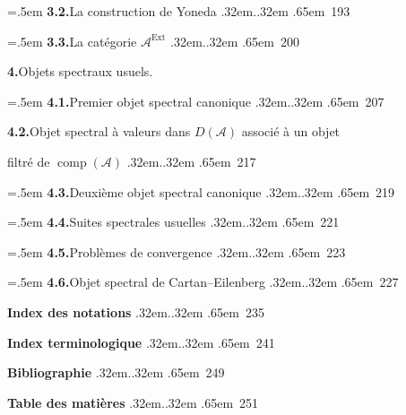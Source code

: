 \clearpage
{}%
\begingroup
\small
\setlength{\parindent}{0pt}%
\setlength{\parskip}{0pt}%
\setlength{\emergencystretch}{3em}%
\newcommand{\VerdierContentsRow}[3]{%
  \par\noindent
  \hangindent=#1\relax\hangafter=1
  \hspace*{#1}#2\nobreak
  \leaders\hbox{\kern.32em.\kern.32em}\hfill
  \nobreak\hbox{\kern.65em #3}\par}
\newcommand{\VerdierContentsWrappedRow}[3]{%
  \par\noindent\hspace*{.5em}#1\par\nobreak
  \noindent\hspace*{3.15em}#2\nobreak
  \leaders\hbox{\kern.32em.\kern.32em}\hfill
  \nobreak\hbox{\kern.65em #3}\par}
\newcommand{\VerdierContentsSection}[2]{%
  \par\addvspace{.55\baselineskip}\noindent
  \hfill\textbf{#1.}\enspace #2\hfill\mbox{}\par\smallskip}

%
\VerdierContentsRow{.5em}{\textbf{3.2.}\enspace La construction de Yoneda}{193}
%
\VerdierContentsRow{.5em}{\textbf{3.3.}\enspace La catégorie $\mathcal A^{\operatorname{Ext}}$}{200}

%
\VerdierContentsSection{4}{Objets spectraux usuels.}
%
\VerdierContentsRow{.5em}{\textbf{4.1.}\enspace Premier objet spectral canonique}{207}
%
\VerdierContentsWrappedRow{\textbf{4.2.}\enspace Objet spectral à valeurs dans $D(\mathcal A)$ associé à un objet}{filtré de $\operatorname{comp}(\mathcal A)$}{217}
%
\VerdierContentsRow{.5em}{\textbf{4.3.}\enspace Deuxième objet spectral canonique}{219}
%
\VerdierContentsRow{.5em}{\textbf{4.4.}\enspace Suites spectrales usuelles}{221}
%
\VerdierContentsRow{.5em}{\textbf{4.5.}\enspace Problèmes de convergence}{223}
%
\VerdierContentsRow{.5em}{\textbf{4.6.}\enspace Objet spectral de Cartan--Eilenberg}{227}

\vspace{1.2\baselineskip}
%
\VerdierContentsRow{0pt}{\textbf{Index des notations}}{235}
\vspace{.8\baselineskip}
%
\VerdierContentsRow{0pt}{\textbf{Index terminologique}}{241}
\vspace{.8\baselineskip}
%
\VerdierContentsRow{0pt}{\textbf{Bibliographie}}{249}
\vspace{.8\baselineskip}
%
\VerdierContentsRow{0pt}{\textbf{Table des matières}}{251}
\endgroup
